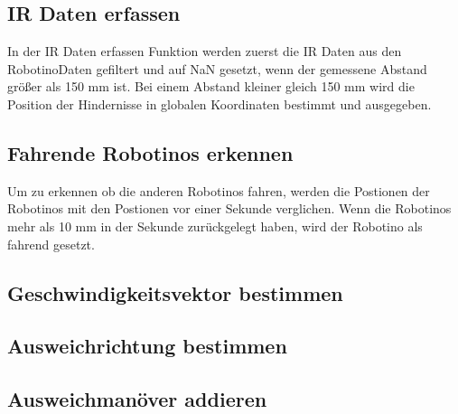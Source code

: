 \subsection{IR Daten erfassen}
In der IR Daten erfassen Funktion werden zuerst die IR Daten aus den RobotinoDaten gefiltert und auf NaN gesetzt, wenn der gemessene Abstand größer als 150 mm ist. Bei einem Abstand kleiner gleich 150 mm wird die Position der Hindernisse in globalen Koordinaten bestimmt und ausgegeben.

\subsection{Fahrende Robotinos erkennen}
Um zu erkennen ob die anderen Robotinos fahren, werden die Postionen der Robotinos mit den Postionen vor einer Sekunde verglichen. Wenn die Robotinos mehr als 10 mm in der Sekunde zurückgelegt haben, wird der Robotino als fahrend gesetzt.

\subsection{Geschwindigkeitsvektor bestimmen}

\subsection{Ausweichrichtung bestimmen}


\subsection{Ausweichmanöver addieren}
